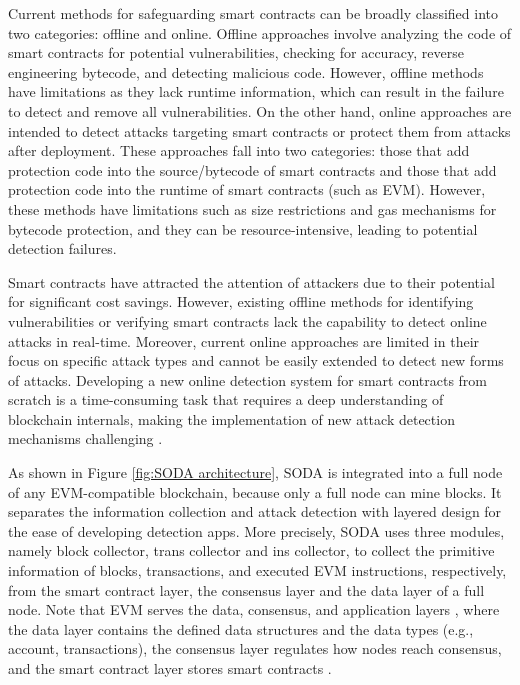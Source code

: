     Current methods for safeguarding smart contracts can be broadly classified into two categories: offline and online. Offline approaches involve analyzing the code of smart contracts for potential vulnerabilities, checking for accuracy, reverse engineering bytecode, and detecting malicious code. However, offline methods have limitations as they lack runtime information, which can result in the failure to detect and remove all vulnerabilities. On the other hand, online approaches are intended to detect attacks targeting smart contracts or protect them from attacks after deployment. These approaches fall into two categories: those that add protection code into the source/bytecode of smart contracts and those that add protection code into the runtime of smart contracts (such as \ac{EVM}). However, these methods have limitations such as size restrictions and gas mechanisms for bytecode protection, and they can be resource-intensive, leading to potential detection failures.

    Smart contracts have attracted the attention of attackers due to their potential for significant cost savings. However, existing offline methods for identifying vulnerabilities or verifying smart contracts lack the capability to detect online attacks in real-time. Moreover, current online approaches are limited in their focus on specific attack types and cannot be easily extended to detect new forms of attacks. Developing a new online detection system for smart contracts from scratch is a time-consuming task that requires a deep understanding of blockchain internals, making the implementation of new attack detection mechanisms challenging \cite{chen2020soda}.


As shown in Figure \ref{fig:SODA architecture}, \ac{SODA} is integrated into a full node of
any \ac{EVM}-compatible blockchain, because only a full node can
mine blocks. It separates the information collection and attack
detection with layered design for the ease of developing detection apps. More precisely, \ac{SODA} uses three modules, namely
block collector, trans collector and ins collector, to collect
the primitive information of blocks, transactions, and executed
\ac{EVM} instructions, respectively, from the smart contract layer,
the consensus layer and the data layer of a full node. Note that
\ac{EVM} serves the data, consensus, and application layers \cite{bez2019scalability},
where the data layer contains the defined data structures and
the data types (e.g., account, transactions), the consensus layer
regulates how nodes reach consensus, and the smart contract
layer stores smart contracts \cite{bez2019scalability}.


